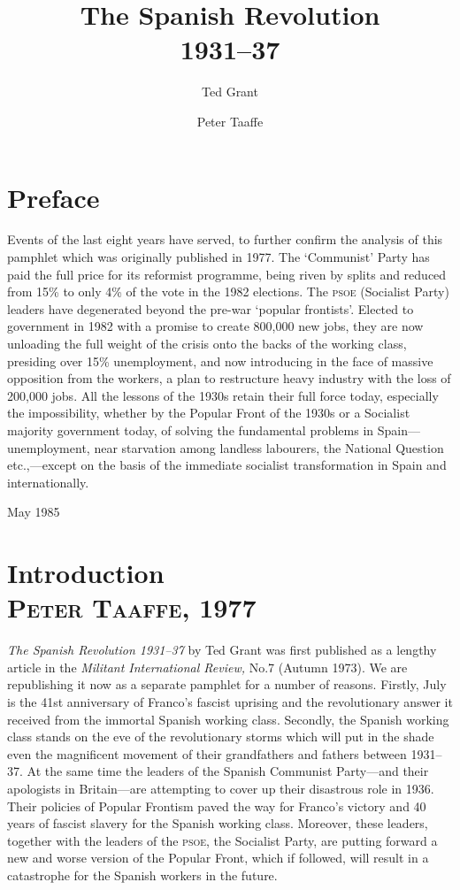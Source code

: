 \documentclass[
  12pt,
  pagesize,
  paper = 6in:9in,
  DIV = 12,
  openany
]{scrbook}
\title{The Spanish Revolution \\ 1931--37}
\author{Ted Grant \and Peter Taaffe}
\date{}
\newcommand{\ac}[1]{\textsc{\lowercase{#1}}}
\begin{document}
\maketitle

\tableofcontents

\frontmatter

\chapter{Preface}

Events of the last eight years have served, to further confirm the
analysis of this pamphlet which was originally published in 1977.
The `Communist' Party has paid the full price for its reformist programme,
being riven by splits and reduced from 15\% to only 4\% of
the vote in the 1982 elections. The \ac{PSOE} (Socialist Party) leaders
have degenerated beyond the pre-war ‘popular frontists'. Elected to
government in 1982 with a promise to create 800,000 new jobs, they
are now unloading the full weight of the crisis onto the backs of the
working class, presiding over 15\% unemployment, and now introducing
in the face of massive opposition from the workers, a plan to
restructure heavy industry with the loss of 200,000 jobs.
All the lessons of the 1930s retain their full force today, especially
the impossibility, whether by the Popular Front of the 1930s or a
Socialist majority government today, of solving the fundamental problems
in Spain---unemployment, near starvation among landless
labourers, the National Question etc.,---except on the basis of the immediate
socialist transformation in Spain and internationally.

\begin{flushright}
  May 1985
\end{flushright}

\mainmatter

\chapter{Introduction \\ \textsc{Peter Taaffe,} 1977}

\emph{The Spanish Revolution 1931--37} by Ted Grant was first published
as a lengthy article in the \emph{Militant International Review,} No.7
(Autumn 1973). We are republishing it now as a separate pamphlet
for a number of reasons. Firstly, July is the 41st anniversary of Franco’s
fascist uprising and the revolutionary answer it received from
the immortal Spanish working class. Secondly, the Spanish working
class stands on the eve of the revolutionary storms which will
put in the shade even the magnificent movement of their grandfathers
and fathers between 1931--37. At the same time the leaders
of the Spanish Communist Party---and their apologists in Britain---are
attempting to cover up their disastrous role in 1936. Their policies
of Popular Frontism paved the way for Franco’s victory and 40 years
of fascist slavery for the Spanish working class. Moreover, these
leaders, together with the leaders of the \ac{PSOE,} the Socialist Party,
are putting forward a new and worse version of the Popular Front,
which if followed, will result in a catastrophe for the Spanish workers
in the future.
\end{document}
